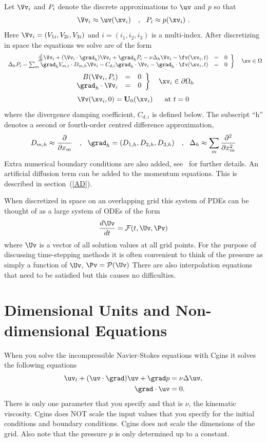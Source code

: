 \documentclass[10pt]{article}
\begin{document}
\newcommand{\id}{i}
\def\Fs {{\cal F}}
Let $\Vv_i$ and $\pd_\id$ denote the discrete approximations to
$\uv$ and $p$ so that
\[
      \Vv_i \approx \uv(\xv_{\id})  \comma
      \pd_{\id} \approx p(\xv_{\id})  ~.
\]
Here $\Vv_i=(V_{1\id},V_{2\id},V_{3\id})$ and
$\id=(i_1,i_2,i_3)$ is a multi-index.
After discretizing in space the equations we solve are of the form
$$
 \left. \begin{array}{rcl}
  {d\over dt} \Vv_i + (\Vv_i\cdot\grad_h)\Vv_i + \grad_h \pd_i
       - \nu \Delta_h \Vv_i -\fv(\xv_i,t) &=&0
                                                \\
  \Delta_h \pd_i - \sum_m \grad_h V_{m,i} \cdot D_{m,h} \Vv_i
   - C_{d,i} \grad_h\cdot\Vv_i
   - \grad_h\cdot\fv(\xv_i,t)  &=&0
        \end{array}\right\} ~~~ \xv\in\Omega
$$
$$
 \left. \begin{array}{rcl}
        B(\Vv_i,\pd_i) &=& 0   \\
   \grad_h\cdot\Vv_i &=& 0
        \end{array}\right\} ~~~ \xv_i\in\partial\Omega_h
$$
$$
   \Vv(\xv_i,0) = \uvd_0(\xv_i)   ~~~~\mbox{ at } t=0
$$
where the divergence damping coefficient, $C_{d,i}$ is defined below.
The subscript ``h'' denotes a second or fourth-order centred difference
approximation,
$$
  D_{m,h} \approx {\partial \over \partial x_m} ~~~,~~
  \grad_h = (D_{1,h}, D_{2,h}, D_{3,h} ) ~~~,~~
  \Delta_h \approx \sum_m {\partial^2 \over \partial x_m^2}
$$
Extra numerical boundary conditions are also added, see~\cite{ICNS}
\cite{BCNS} for further details. An artificial diffusion term can be
added to the momentum equations. This is described in section~(\ref{AD}).

\def\Ps {{\cal P}}
When discretized in space on an overlapping grid this system of PDEs
can be thought of as a large system of ODEs of the form
$$
    {d \Uv \over dt} = \Fs(t,\Uv,\Pv)
$$
where $\Uv$ is a vector of all solution values at all grid points.
For the purpose of discussing time-stepping methods it is often
convenient to think of the pressure as simply a function of $\Uv$,
$\Pv=\Ps(\Uv)$
There are also interpolation equations that need to be satisfied but
this causes no difficulties.

\clearpage
\section{Dimensional Units and Non-dimensional Equations}


When you solve the incompressible Navier-Stokes equations with Cgins
it solves the following equations
\begin{align}
   \uv_t + (\uv\cdot\grad)\uv + \grad p &= \nu \Delta \uv, \label{eq:uvc} \\
   \grad\cdot\uv &= 0.
\end{align}
There is only one parameter that you specify and that is $\nu$, the kinematic
viscosity. Cgins does NOT scale the input values that you specify for the
initial conditions and boundary conditions. Cgins does not scale the dimensions
of the grid.  Also note that the pressure $p$ is only determined up to a
constant.
\end{document}
